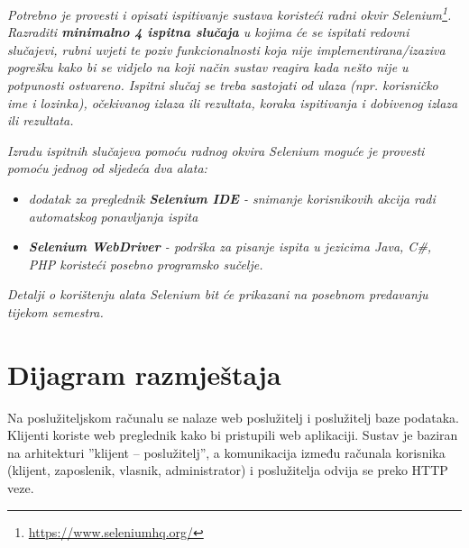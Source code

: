			 \textit{Potrebno je provesti i opisati ispitivanje sustava koristeći radni okvir Selenium\footnote{\url{https://www.seleniumhq.org/}}. Razraditi \textbf{minimalno 4 ispitna slučaja} u kojima će se ispitati redovni slučajevi, rubni uvjeti te poziv funkcionalnosti koja nije implementirana/izaziva pogrešku kako bi se vidjelo na koji način sustav reagira kada nešto nije u potpunosti ostvareno. Ispitni slučaj se treba sastojati od ulaza (npr. korisničko ime i lozinka), očekivanog izlaza ili rezultata, koraka ispitivanja i dobivenog izlaza ili rezultata.\\ }
			 
			 \textit{Izradu ispitnih slučajeva pomoću radnog okvira Selenium moguće je provesti pomoću jednog od sljedeća dva alata:}
			 \begin{itemize}
			 	\item \textit{dodatak za preglednik \textbf{Selenium IDE} - snimanje korisnikovih akcija radi automatskog ponavljanja ispita	}
			 	\item \textit{\textbf{Selenium WebDriver} - podrška za pisanje ispita u jezicima Java, C\#, PHP koristeći posebno programsko sučelje.}
			 \end{itemize}
		 	\textit{Detalji o korištenju alata Selenium bit će prikazani na posebnom predavanju tijekom semestra.}
			
			\eject 
		
		
		\section{Dijagram razmještaja}
			
			

			{ Na poslužiteljskom računalu se nalaze web poslužitelj i poslužitelj baze podataka. Klijenti koriste web
			preglednik kako bi pristupili web aplikaciji. Sustav je baziran na arhitekturi ”klijent – poslužitelj”, a
			komunikacija između računala korisnika (klijent, zaposlenik, vlasnik, administrator) i poslužitelja odvija se preko HTTP veze. }

